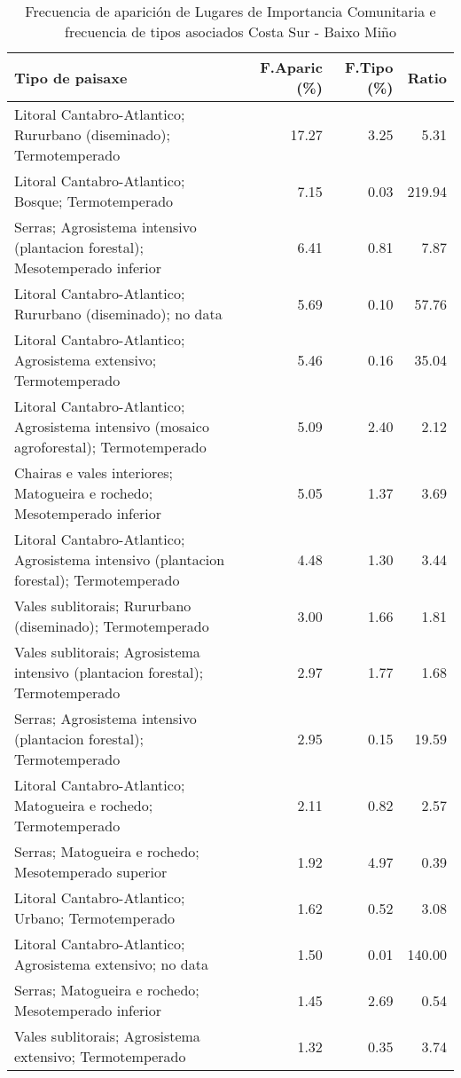 \begin{table}[p]
\centering
\caption{Frecuencia de aparición de Lugares de Importancia Comunitaria e frecuencia de tipos asociados Costa Sur - Baixo Miño} 
\label{vnatura3}
\begin{tabular}{lrrr}
  \hline
Tipo de paisaxe & F.Aparic (\%) & F.Tipo (\%) & Ratio \\ 
  \hline
Litoral Cantabro-Atlantico; Rururbano (diseminado); Termotemperado & 17.27 & 3.25 & 5.31 \\ 
  Litoral Cantabro-Atlantico; Bosque; Termotemperado & 7.15 & 0.03 & 219.94 \\ 
  Serras; Agrosistema intensivo (plantacion forestal); Mesotemperado inferior & 6.41 & 0.81 & 7.87 \\ 
  Litoral Cantabro-Atlantico; Rururbano (diseminado); no data & 5.69 & 0.10 & 57.76 \\ 
  Litoral Cantabro-Atlantico; Agrosistema extensivo; Termotemperado & 5.46 & 0.16 & 35.04 \\ 
  Litoral Cantabro-Atlantico; Agrosistema intensivo (mosaico agroforestal); Termotemperado & 5.09 & 2.40 & 2.12 \\ 
  Chairas e vales interiores; Matogueira e rochedo; Mesotemperado inferior & 5.05 & 1.37 & 3.69 \\ 
  Litoral Cantabro-Atlantico; Agrosistema intensivo (plantacion forestal); Termotemperado & 4.48 & 1.30 & 3.44 \\ 
  Vales sublitorais; Rururbano (diseminado); Termotemperado & 3.00 & 1.66 & 1.81 \\ 
  Vales sublitorais; Agrosistema intensivo (plantacion forestal); Termotemperado & 2.97 & 1.77 & 1.68 \\ 
  Serras; Agrosistema intensivo (plantacion forestal); Termotemperado & 2.95 & 0.15 & 19.59 \\ 
  Litoral Cantabro-Atlantico; Matogueira e rochedo; Termotemperado & 2.11 & 0.82 & 2.57 \\ 
  Serras; Matogueira e rochedo; Mesotemperado superior & 1.92 & 4.97 & 0.39 \\ 
  Litoral Cantabro-Atlantico; Urbano; Termotemperado & 1.62 & 0.52 & 3.08 \\ 
  Litoral Cantabro-Atlantico; Agrosistema extensivo; no data & 1.50 & 0.01 & 140.00 \\ 
  Serras; Matogueira e rochedo; Mesotemperado inferior & 1.45 & 2.69 & 0.54 \\ 
  Vales sublitorais; Agrosistema extensivo; Termotemperado & 1.32 & 0.35 & 3.74 \\ 

\end{tabular}
\end{table}

